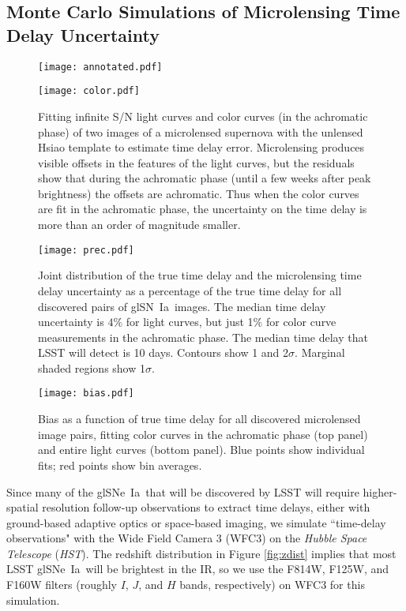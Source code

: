 \documentclass[iop,apj,numberedappendix,twocolappendix]{emulateapj}
\newcommand{\snia}{{\rm SN~Ia}}
\newcommand{\sneia}{{\rm SNe~Ia}}
\newcommand{\hst}{\textit{HST}}
\begin{document}
\subsection{Monte Carlo Simulations of Microlensing Time Delay Uncertainty}


\begin{figure*}
\centering
  \hspace{-4mm}\texttt{[image: annotated.pdf]}%
\par\medskip
  \texttt{[image: color.pdf]}%
\caption{Fitting infinite S/N light curves and color curves (in the achromatic phase) of two images of a microlensed supernova with the unlensed Hsiao template to estimate time delay error.
Microlensing produces visible offsets in the features of the light curves, but the residuals show that during the achromatic phase (until a few weeks after peak brightness) the offsets are achromatic.
Thus when the color curves are fit in the achromatic phase, the uncertainty on the time delay is more than an order of magnitude smaller. 
}
\label{fig:fits}
\end{figure*}

\begin{figure}
	\centering
	\texttt{[image: prec.pdf]}
    \caption{Joint distribution of the true time delay and the microlensing time delay uncertainty as a percentage of the true time delay for all discovered pairs of gl\snia\ images.
    The median time delay uncertainty is $4\%$ for light curves, but just 1$\%$ for color curve measurements in the achromatic phase.
    The median time delay that LSST will detect is 10 days.
    Contours show 1 and 2$\sigma$.
    Marginal shaded regions show 1$\sigma$.
    }
    \label{fig:prec}
\end{figure}

\begin{figure}
	\centering
    \texttt{[image: bias.pdf]}
    \caption{Bias as a function of true time delay for all discovered microlensed image pairs, fitting color curves in the achromatic phase (top panel) and entire light curves (bottom panel). 
    Blue points show individual fits; red points show bin averages. 
    }
    \label{fig:bias}
\end{figure}

Since many of the gl\sneia\ that will be discovered by LSST will require higher-spatial resolution follow-up observations to extract time delays, either with ground-based adaptive optics or space-based imaging, we simulate ``time-delay observations" with the Wide Field Camera 3 (WFC3) on the \textit{Hubble Space Telescope} (\hst).
The redshift distribution in Figure \ref{fig:zdist} implies that most LSST gl\sneia\ will be brightest in the IR, so we use the F814W, F125W, and F160W filters (roughly $I$, $J$, and $H$ bands, respectively) on WFC3  for this simulation. 
\end{document}
